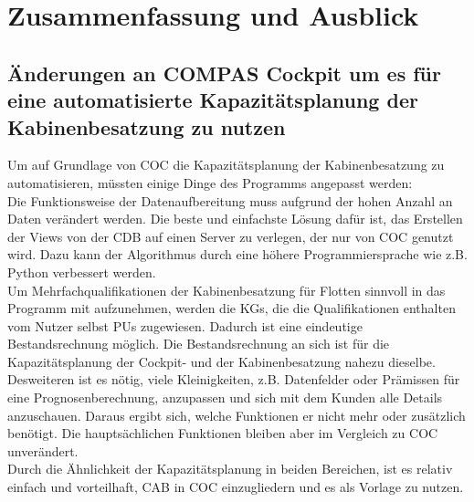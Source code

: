 \documentclass [12pt, a4paper, oneside, titlepage, ngerman]{article}
\begin{document}
\newpage

\section {Zusammenfassung und Ausblick}
\subsection{Änderungen an COMPAS Cockpit um es für eine automatisierte Kapazitätsplanung der Kabinenbesatzung zu nutzen}
Um auf Grundlage von \ac{COC} die Kapazitätsplanung der Kabinenbesatzung zu automatisieren, müssten einige Dinge des Programms angepasst werden: \\
Die Funktionsweise der Datenaufbereitung muss aufgrund der hohen Anzahl an Daten verändert werden. Die beste und einfachste Lösung dafür ist, das Erstellen der Views von der \ac{CDB} auf einen Server zu verlegen, der nur von \ac{COC} genutzt wird. Dazu kann der Algorithmus durch eine höhere Programmiersprache wie z.B. Python verbessert werden. \\
Um Mehrfachqualifikationen der Kabinenbesatzung für Flotten sinnvoll in das Programm mit aufzunehmen, werden die \acp{KG}, die die Qualifikationen enthalten vom Nutzer selbst \acp{PU} zugewiesen. Dadurch ist eine eindeutige Bestandsrechnung möglich. Die Bestandsrechnung an sich ist für die Kapazitätsplanung der Cockpit- und der Kabinenbesatzung nahezu dieselbe. \\
Desweiteren ist es nötig, viele Kleinigkeiten, z.B. Datenfelder oder Prämissen für eine Prognosenberechnung, anzupassen und sich mit dem Kunden alle Details anzuschauen. Daraus ergibt sich, welche Funktionen er nicht mehr oder zusätzlich benötigt. Die hauptsächlichen Funktionen bleiben aber im Vergleich zu \ac{COC} unverändert. \\
Durch die Ähnlichkeit der Kapazitätsplanung in beiden Bereichen, ist es relativ einfach und vorteilhaft, \ac{CAB} in \ac{COC} einzugliedern und es als Vorlage zu nutzen. 
\end{document}
